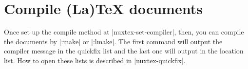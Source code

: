 \section{Compile (La)TeX documents}

Once set up the compile method at |nuxtex-set-compiler|, then, you can compile the documents by |:make| or |:lmake|. The first command will output the compiler message in the quickfix list and the last one will output in the location list. How to open these lists is described in |nuxtex-quickfix|.

